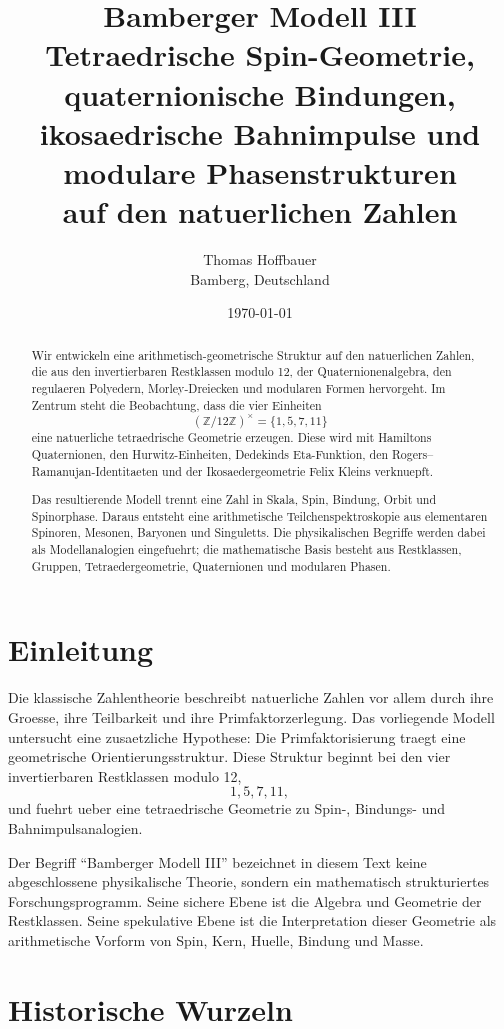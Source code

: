 \documentclass[11pt,a4paper]{article}
\title{Bamberger Modell III\\
Tetraedrische Spin-Geometrie, quaternionische Bindungen,\\
ikosaedrische Bahnimpulse und modulare Phasenstrukturen\\
auf den natuerlichen Zahlen}
\author{Thomas Hoffbauer\\Bamberg, Deutschland}
\date{\today}
\theoremstyle{definition}
\theoremstyle{remark}
\newcommand{\Z}{\mathbb Z}
\begin{document}
\maketitle

\begin{abstract}
Wir entwickeln eine arithmetisch-geometrische Struktur auf den natuerlichen Zahlen,
die aus den invertierbaren Restklassen modulo 12, der Quaternionenalgebra, den
regulaeren Polyedern, Morley-Dreiecken und modularen Formen hervorgeht. Im Zentrum
steht die Beobachtung, dass die vier Einheiten
\[
(\Z/12\Z)^\times=\{1,5,7,11\}
\]
eine natuerliche tetraedrische Geometrie erzeugen. Diese wird mit Hamiltons
Quaternionen, den Hurwitz-Einheiten, Dedekinds Eta-Funktion, den
Rogers--Ramanujan-Identitaeten und der Ikosaedergeometrie Felix Kleins verknuepft.

Das resultierende Modell trennt eine Zahl in Skala, Spin, Bindung, Orbit und
Spinorphase. Daraus entsteht eine arithmetische Teilchenspektroskopie aus
elementaren Spinoren, Mesonen, Baryonen und Singuletts. Die physikalischen
Begriffe werden dabei als Modellanalogien eingefuehrt; die mathematische Basis
besteht aus Restklassen, Gruppen, Tetraedergeometrie, Quaternionen und modularen
Phasen.
\end{abstract}

\tableofcontents

\section{Einleitung}

Die klassische Zahlentheorie beschreibt natuerliche Zahlen vor allem durch ihre
Groesse, ihre Teilbarkeit und ihre Primfaktorzerlegung. Das vorliegende Modell
untersucht eine zusaetzliche Hypothese: Die Primfaktorisierung traegt eine
geometrische Orientierungsstruktur. Diese Struktur beginnt bei den vier
invertierbaren Restklassen modulo 12,
\[
1,5,7,11,
\]
und fuehrt ueber eine tetraedrische Geometrie zu Spin-, Bindungs- und
Bahnimpulsanalogien.

Der Begriff \enquote{Bamberger Modell III} bezeichnet in diesem Text keine
abgeschlossene physikalische Theorie, sondern ein mathematisch strukturiertes
Forschungsprogramm. Seine sichere Ebene ist die Algebra und Geometrie der
Restklassen. Seine spekulative Ebene ist die Interpretation dieser Geometrie als
arithmetische Vorform von Spin, Kern, Huelle, Bindung und Masse.

\section{Historische Wurzeln}
\end{document}

